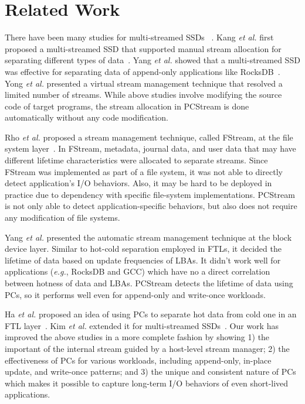 \vspace{-10pt}
\section{Related Work}
\vspace{-5pt}

There have been many studies for multi-streamed SSDs ~\cite{MultiStream, Level,
vStream, FStream, AutoStream, PCStream}.  Kang {\it et al.} first proposed a
multi-streamed SSD that supported manual stream allocation for separating
different types of data~\cite{MultiStream}.  Yang {\it et al.} showed that a
multi-streamed SSD was effective for separating data of append-only
applications like RocksDB~\cite{Level}.  Yong {\it et al.} presented a virtual
stream management technique that resolved a limited number of streams.  While
above studies involve modifying the source code of target programs, the
stream allocation in PCStream is done automatically without any code
modification.

Rho {\it et al.} proposed a stream management technique, called FStream, at the
file system layer~\cite{FStream}. In FStream, metadata, journal
data, and user data that may have different lifetime characteristics were
allocated to separate streams.  Since FStream was implemented as part of a file
system, it was not able to directly detect application's I/O behaviors.
Also, it may be hard to be deployed in practice due to 
dependency with specific file-system implementations. PCStream is not
only able to detect application-specific behaviors, but also does not require
any modification of file systems.

Yang {\it et al.} presented the automatic stream management technique at the
block device layer. Similar to hot-cold separation employed in FTLs,
it decided the lifetime of data based on update frequencies of LBAs.
It didn't work well for applications ({\it e.g.}, RocksDB
and GCC) which have no a direct correlation between hotness of data
and LBAs.  PCStream detects the lifetime of data using PCs, so it
performs well even for append-only and write-once workloads.

Ha {\it et al.} proposed an idea of using PCs to separate hot data from cold
one in an FTL layer~\cite{PCHa}.  Kim {\it et al.} extended it for
multi-streamed SSDs~\cite{PCStream}.  Our work has improved the above
studies in a more complete fashion by showing 1) the important of the
internal stream guided by a host-level stream manager; 2) the effectiveness of
PCs for various workloads, including append-only, in-place update, and
write-once patterns; and 3) the unique and consistent nature of PCs which makes
it possible to capture long-term I/O behaviors of even short-lived
applications.


